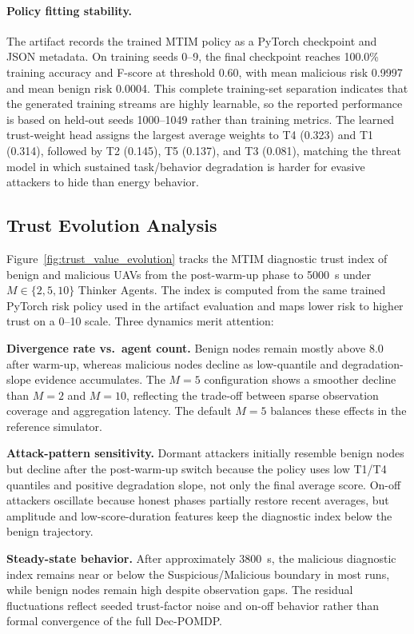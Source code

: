 \documentclass[notspecified,article,submit,moreauthors]{Definitions/mdpi}
\begin{document}
\paragraph{Policy fitting stability.}
The artifact records the trained MTIM policy as a PyTorch checkpoint and JSON metadata. On training seeds 0--9, the final checkpoint reaches 100.0\% training accuracy and F-score at threshold 0.60, with mean malicious risk 0.9997 and mean benign risk 0.0004. This complete training-set separation indicates that the generated training streams are highly learnable, so the reported performance is based on held-out seeds 1000--1049 rather than training metrics. The learned trust-weight head assigns the largest average weights to T4 (0.323) and T1 (0.314), followed by T2 (0.145), T5 (0.137), and T3 (0.081), matching the threat model in which sustained task/behavior degradation is harder for evasive attackers to hide than energy behavior.

\subsection{Trust Evolution Analysis}
\label{sec:trust_evolution}
Figure~\ref{fig:trust_value_evolution} tracks the MTIM diagnostic trust index of benign and malicious UAVs from the post-warm-up phase to 5000~s under $M \in \{2, 5, 10\}$ Thinker Agents. The index is computed from the same trained PyTorch risk policy used in the artifact evaluation and maps lower risk to higher trust on a 0--10 scale. Three dynamics merit attention:

\textbf{Divergence rate vs.\ agent count.} Benign nodes remain mostly above 8.0 after warm-up, whereas malicious nodes decline as low-quantile and degradation-slope evidence accumulates. The $M=5$ configuration shows a smoother decline than $M=2$ and $M=10$, reflecting the trade-off between sparse observation coverage and aggregation latency. The default $M = 5$ balances these effects in the reference simulator.

\textbf{Attack-pattern sensitivity.} Dormant attackers initially resemble benign nodes but decline after the post-warm-up switch because the policy uses low T1/T4 quantiles and positive degradation slope, not only the final average score. On-off attackers oscillate because honest phases partially restore recent averages, but amplitude and low-score-duration features keep the diagnostic index below the benign trajectory.

\textbf{Steady-state behavior.} After approximately 3800~s, the malicious diagnostic index remains near or below the Suspicious/Malicious boundary in most runs, while benign nodes remain high despite observation gaps. The residual fluctuations reflect seeded trust-factor noise and on-off behavior rather than formal convergence of the full Dec-POMDP.
\end{document}
